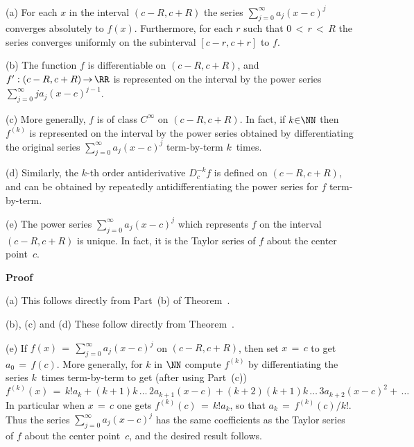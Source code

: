         (a) For each $x$ in the interval $(c-R,c+R)$ the series $\sum_{j=0}^{{\infty}} a_{j}(x-c)^{j}$ converges absolutely to $f(x)$.
    Furthermore, for each $r$ such that $0\,<\,r\,<\,R$ the series converges uniformly on the subinterval $[c-r,c+r]$ to $f$.

\V

        (b) The function $f$ is differentiable on $(c-R,c+R)$, and $f':(c-R,c+R) \,{\rightarrow}\, {\RR}$ is represented on the interval by the power series $\sum_{j=0}^{{\infty}} ja_{j}(x-c)^{j-1}$.

\V

        (c) More generally, $f$ is of class $C^{{\infty}}$ on $(c-R,c+R)$. In fact,
    if $k{\in}{\NN}$ then $f^{(k)}$ is represented on the interval by the power series obtained by differentiating the original series $\sum_{j=0}^{{\infty}} a_{j}(x-c)^{j}$ term-by-term $k$~times.

\V

        (d) Similarly, the $k$-th order antiderivative $D^{-k}_{c} f$ is defined on $(c-R,c+R)$,
    and can be obtained by repeatedly antidifferentiating the power series for $f$ term-by-term.

\V

        (e) The power series $\sum_{j=0}^{{\infty}} a_{j}(x-c)^{j}$ which represents $f$ on the interval $(c-R,c+R)$ is unique.
    In fact, it is the Taylor series of $f$ about the center point~$c$.

\V

        {\bf Proof}

\V

        (a) This follows directly from Part~(b) of Theorem~.

\V

        (b), (c) and (d) These follow directly from Theorem~.

\V

        (e) If $f(x) \,=\, \sum_{j=0}^{{\infty}} a_{j}(x-c)^{j}$ on $(c-R,c+R)$, then set $x \,=\, c$ to get $a_{0} \,=\, f(c)$.
    More generally, for $k$ in ${\NN}$ compute $f^{(k)}$ by differentiating the series $k$~times term-by-term to get (after using Part~(c))
        \begin{displaymath}
        f^{(k)}(x) \,=\, k!a_{k} + (k+1)k\,{\ldots}\,2a_{k+1}(x-c) + (k+2)(k+1)k\,{\ldots}\,3a_{k+2}(x-c)^{2} + \,{\ldots}\,
        \end{displaymath}
    In particular when $x \,=\, c$ one gets $f^{(k)}(c) \,=\, k!a_{k}$, so that $a_{k} \,=\, f^{(k)}(c)/k!$.
    Thus the series $\sum_{j=0}^{{\infty}} a_{j}(x-c)^{j}$ has the same coefficients as the Taylor series of $f$ about the center point~$c$, and the desired result follows.

